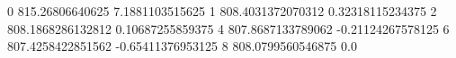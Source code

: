 0 815.26806640625 7.1881103515625
1 808.4031372070312 0.32318115234375
2 808.1868286132812 0.10687255859375
4 807.8687133789062 -0.21124267578125
6 807.4258422851562 -0.65411376953125
8 808.0799560546875 0.0
